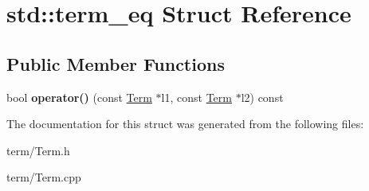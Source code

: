 \hypertarget{structstd_1_1term__eq}{\section{std\-:\-:term\-\_\-eq \-Struct \-Reference}
\label{structstd_1_1term__eq}
}
\subsection*{\-Public \-Member \-Functions}
\begin{DoxyCompactItemize}
\item 
\hypertarget{structstd_1_1term__eq_a85c53edbcb8642a5ec013983d66802a9}{bool {\bfseries operator()} (const \hyperlink{classTerm}{\-Term} $\ast$l1, const \hyperlink{classTerm}{\-Term} $\ast$l2) const }\label{structstd_1_1term__eq_a85c53edbcb8642a5ec013983d66802a9}

\end{DoxyCompactItemize}


\-The documentation for this struct was generated from the following files\-:\begin{DoxyCompactItemize}
\item 
term/\-Term.\-h\item 
term/\-Term.\-cpp\end{DoxyCompactItemize}
